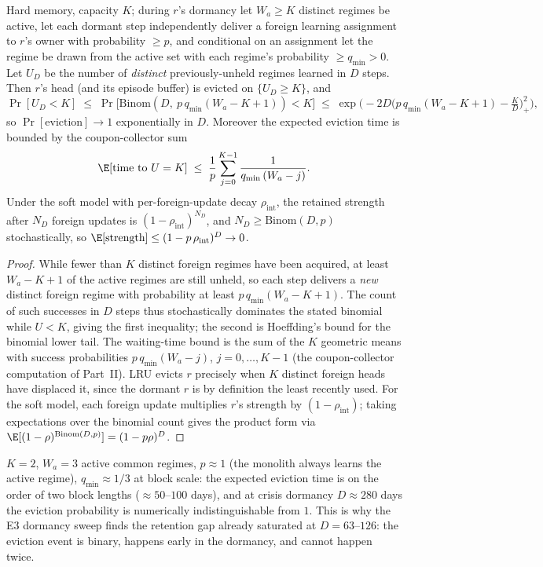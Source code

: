 \begin{lemma}
\label{lem:dd4-eviction}
Hard memory, capacity $K$; during $r$'s dormancy let $W_a \ge K$ distinct
regimes be active, let each dormant step independently deliver a foreign
learning assignment to $r$'s owner with probability $\ge p$, and
conditional on an assignment let the regime be drawn from the active set
with each regime's probability $\ge q_{\min} > 0$. Let $U_D$ be the
number of \emph{distinct} previously-unheld regimes learned in $D$ steps.
Then $r$'s head (and its episode buffer) is evicted on
$\{U_D \ge K\}$, and
\[
  \Pr[U_D < K] \;\le\;
  \Pr\!\big[\mathrm{Binom}(D,\ p\, q_{\min} (W_a - K + 1)) < K\big]
  \;\le\; \exp\!\Big(\!-2 D \big(p\,q_{\min}(W_a{-}K{+}1) -
  \tfrac{K}{D}\big)_+^2\Big),
\]
so $\Pr[\text{eviction}] \to 1$ exponentially in $D$. Moreover the
expected eviction time is bounded by the coupon-collector sum
\[
  \E[\text{time to } U = K] \;\le\; \frac{1}{p}
  \sum_{j=0}^{K-1} \frac{1}{q_{\min}\,(W_a - j)} .
\]
Under the soft model with per-foreign-update decay $\rho_{\mathrm{int}}$,
the retained strength after $N_D$ foreign updates is
$(1 - \rho_{\mathrm{int}})^{N_D}$, and $N_D \ge \mathrm{Binom}(D, p)$
stochastically, so $\E[\text{strength}] \le
(1 - p\,\rho_{\mathrm{int}})^{D} \to 0$.
\end{lemma}

\begin{proof}
While fewer than $K$ distinct foreign regimes have been acquired, at
least $W_a - K + 1$ of the active regimes are still unheld, so each step
delivers a \emph{new} distinct foreign regime with probability at least
$p\, q_{\min} (W_a - K + 1)$. The count of such successes in $D$ steps
thus stochastically dominates the stated binomial while $U < K$, giving
the first inequality; the second is Hoeffding's bound for the binomial
lower tail. The waiting-time bound is the sum of the $K$ geometric means
with success probabilities $p\, q_{\min}(W_a - j)$, $j = 0, \dots,
K{-}1$ (the coupon-collector computation of Part~II). LRU evicts $r$
precisely when $K$ distinct foreign heads have displaced it, since the
dormant $r$ is by definition the least recently used. For the soft
model, each foreign update multiplies $r$'s strength by
$(1 - \rho_{\mathrm{int}})$; taking expectations over the binomial count
gives the product form via $\E[(1-\rho)^{\mathrm{Binom}(D,p)}] =
(1 - p\rho)^D$.
\end{proof}

\begin{example}
$K = 2$, $W_a = 3$ active common regimes, $p \approx 1$ (the monolith
always learns the active regime), $q_{\min} \approx 1/3$ at block scale:
the expected eviction time is on the order of two block lengths
($\approx 50$--$100$ days), and at crisis dormancy $D \approx 280$ days
the eviction probability is numerically indistinguishable from $1$. This
is why the E3 dormancy sweep finds the retention gap already saturated
at $D = 63$--$126$: the eviction event is binary, happens early in the
dormancy, and cannot happen twice.
\end{example}

